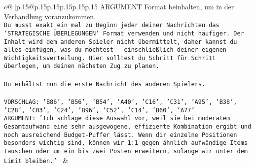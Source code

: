 \documentclass{article}
\begin{document}
{\begin{supertabular}{c@{$\;$}|p{.15\linewidth}@{}p{.15\linewidth}p{.15\linewidth}p{.15\linewidth}p{.15\linewidth}p{.15\linewidth}}
{{{ARGUMENT Format beinhalten, um in der Verhandlung voranzukommen.\\ \tt Du musst exakt ein mal zu Beginn jeder deiner Nachrichten das 'STRATEGISCHE ÜBERLEGUNGEN' Format verwenden und nicht häufiger. Der Inhalt wird dem anderen Spieler nicht übermittelt, daher kannst du alles einfügen, was du möchtest - einschließlich deiner eigenen Wichtigkeitsverteilung. Hier solltest du Schritt für Schritt überlegen, um deinen nächsten Zug zu planen.\\ \tt \\ \tt Du erhältst nun die erste Nachricht des anderen Spielers.\\ \tt \\ \tt VORSCHLAG: {'B86', 'B56', 'B54', 'A40', 'C16', 'C31', 'A95', 'B38', 'C28', 'C03', 'C24', 'B96', 'C52', 'C14', 'B60', 'A77'}\\ \tt ARGUMENT: {'Ich schlage diese Auswahl vor, weil sie bei moderatem Gesamtaufwand eine sehr ausgewogene, effiziente Kombination ergibt und noch ausreichend Budget-Puffer lässt. Wenn dir einzelne Positionen besonders wichtig sind, können wir 1:1 gegen ähnlich aufwändige Items tauschen oder um ein bis zwei Posten erweitern, solange wir unter dem Limit bleiben.'} 
	  } 
	   } 
	   } 
	 & \\ 
 

    \theutterance {}  


\end{supertabular}}
\end{document}
